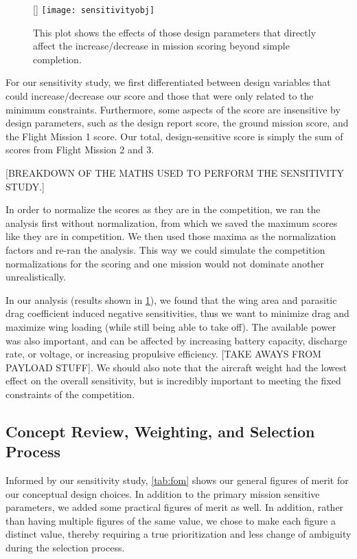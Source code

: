 \documentclass[report]{byu-aero}
\begin{document}
\begin{figure}[h!]
	\centering
	\raisebox{0pt}[\dimexpr{}\baselineskip\relax]{
		\texttt{[image: sensitivityobj]}
	}
	\caption{This plot shows the effects of those design parameters that directly affect the increase/decrease in mission scoring beyond simple completion.}
	\label{fig:sensitivity}
\end{figure}

For our sensitivity study, we first differentiated between design variables that could increase/decrease our score and those that were only related to the minimum constraints. Furthermore, some aspects of the score are insensitive by design parameters, such as the design report score, the ground mission score, and the Flight Mission 1 score.  Our total, design-sensitive score is simply the sum of scores from Flight Mission 2 and 3.

{\color{\BYUred} [BREAKDOWN OF THE MATHS USED TO PERFORM THE SENSITIVITY STUDY.]}

In order to normalize the scores as they are in the competition, we ran the analysis first without normalization, from which we saved the maximum scores like they are in competition. We then used those maxima as the normalization factors and re-ran the analysis. This way we could simulate the competition normalizations for the scoring and one mission would not dominate another unrealistically.

In our analysis (results shown in \cref{fig:sensitivity}), we found that the wing area and parasitic drag coefficient induced negative sensitivities, thus we want to minimize drag and maximize wing loading (while still being able to take off).  The available power was also important, and can be affected by increasing battery capacity, discharge rate, or voltage, or increasing propulsive efficiency. {\color{BYUred}[TAKE AWAYS FROM PAYLOAD STUFF]}. We should also note that the aircraft weight had the lowest effect on the overall sensitivity, but is incredibly important to meeting the fixed constraints of the competition.




\subsection{Concept Review, Weighting, and Selection Process}
\label{ssec:selectionprocess}

Informed by our sensitivity study, \cref{tab:fom} shows our general figures of merit for our conceptual design choices. In addition to the primary mission sensitive parameters, we added some practical figures of merit as well.  In addition, rather than having multiple figures of the same value, we chose to make each figure a distinct value, thereby requiring a true prioritization and less change of ambiguity during the selection process.
\end{document}
